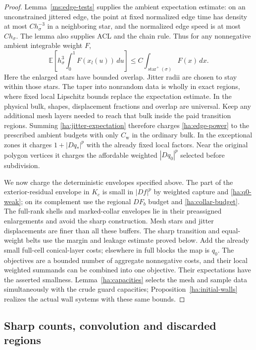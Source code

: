 \begin{proof}
Lemma~\ref{ms:edge-tests} supplies the ambient expectation estimate:
on an unconstrained jittered edge, the point at fixed normalized
edge time has density at most $C h_\sigma^{-3}$ in a neighboring
star, and the normalized edge speed is at most $C h_\sigma$.
The lemma also supplies ACL and the chain rule.  Thus for any
nonnegative ambient integrable weight $F$,
\begin{equation}\label{ha:jitter-expectation}
 \mathbb E\left[h_\sigma^3\int_0^1F(x_l(u))\,du\right]
       \le C\int_{\operatorname{star}^+(\sigma)}F(x)\,dx.
\end{equation}
Here the enlarged stars have bounded overlap.  Jitter radii are
chosen to stay within those stars.  The taper into nonrandom data is
wholly in exact regions, where fixed local Lipschitz bounds replace
the expectation estimate.  In the physical bulk, shapes, displacement
fractions and overlap are universal.  Keep any additional mesh layers
needed to reach that bulk inside the paid transition regions.
Summing \eqref{ha:jitter-expectation} therefore charges
\eqref{ha:edge-power} to the prescribed ambient budgets with only
$C_{\mathrm w}$ in the ordinary bulk.  In the exceptional zones it
charges $1+|Dq_*|^p$ with the already fixed local factors.  Near the
original polygon vertices it charges the affordable weighted
$|Dq_0|^p$ selected before subdivision.

We now charge the deterministic envelopes specified above.  The
part of the exterior-residual envelope in $K_c$ is small in
$|Df|^p$ by weighted capture and \eqref{ha:q0-weak}; on its complement
use the regional $DF_b$ budget and \eqref{ha:collar-budget}.  The
full-rank shells and marked-collar envelopes lie in their preassigned
enlargements and avoid the sharp construction.  Mesh stars and
jitter displacements are finer than all these buffers.  The sharp
transition and equal-weight belts use the margin and leakage estimate
proved below.  Add the already small full-cell conical-layer costs;
elsewhere in full blocks the map is $q_0$.  The objectives are a
bounded number of aggregate nonnegative costs, and their local
weighted summands can be combined into one objective.  Their
expectations have the asserted smallness.  Lemma~\ref{ha:capacities}
selects the mesh and sample data simultaneously with the crude guard
capacities; Proposition~\ref{ha:initial-walls} realizes the actual
wall systems with these same bounds.
\end{proof}

\subsection{Sharp counts, convolution and discarded regions}
\label{ha:sharp-errors}

